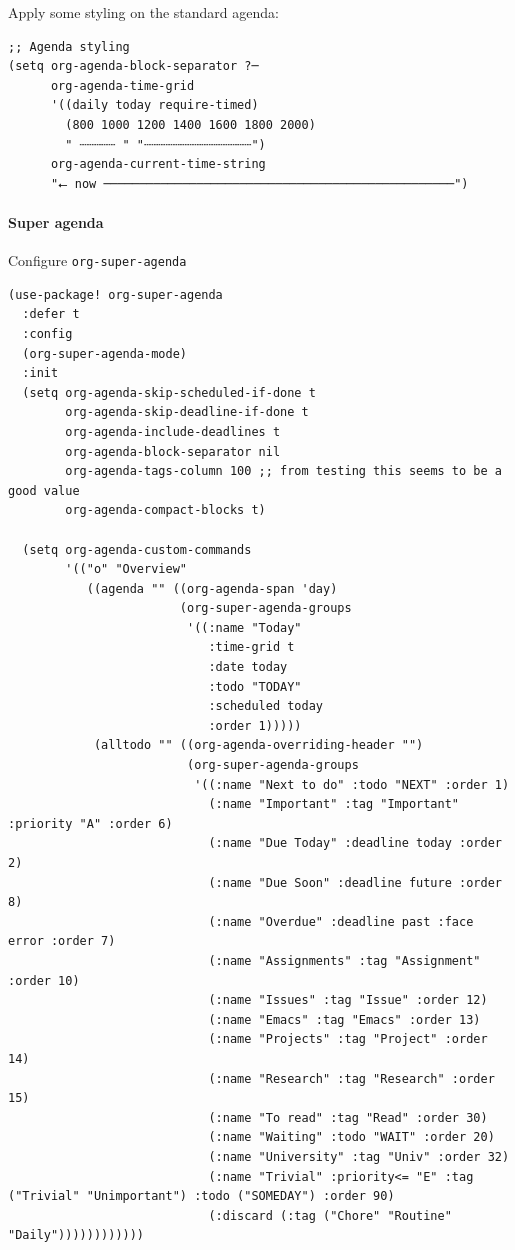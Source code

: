 \documentclass[11pt]{article}
\begin{document}
Apply some styling on the standard agenda:

\begin{verbatim}
;; Agenda styling
(setq org-agenda-block-separator ?─
      org-agenda-time-grid
      '((daily today require-timed)
        (800 1000 1200 1400 1600 1800 2000)
        " ┄┄┄┄┄ " "┄┄┄┄┄┄┄┄┄┄┄┄┄┄┄")
      org-agenda-current-time-string
      "⭠ now ─────────────────────────────────────────────────")
\end{verbatim}

\paragraph{Super agenda}
\label{sec:org330f9b6}
Configure \texttt{org-super-agenda}

\begin{verbatim}
(use-package! org-super-agenda
  :defer t
  :config
  (org-super-agenda-mode)
  :init
  (setq org-agenda-skip-scheduled-if-done t
        org-agenda-skip-deadline-if-done t
        org-agenda-include-deadlines t
        org-agenda-block-separator nil
        org-agenda-tags-column 100 ;; from testing this seems to be a good value
        org-agenda-compact-blocks t)

  (setq org-agenda-custom-commands
        '(("o" "Overview"
           ((agenda "" ((org-agenda-span 'day)
                        (org-super-agenda-groups
                         '((:name "Today"
                            :time-grid t
                            :date today
                            :todo "TODAY"
                            :scheduled today
                            :order 1)))))
            (alltodo "" ((org-agenda-overriding-header "")
                         (org-super-agenda-groups
                          '((:name "Next to do" :todo "NEXT" :order 1)
                            (:name "Important" :tag "Important" :priority "A" :order 6)
                            (:name "Due Today" :deadline today :order 2)
                            (:name "Due Soon" :deadline future :order 8)
                            (:name "Overdue" :deadline past :face error :order 7)
                            (:name "Assignments" :tag "Assignment" :order 10)
                            (:name "Issues" :tag "Issue" :order 12)
                            (:name "Emacs" :tag "Emacs" :order 13)
                            (:name "Projects" :tag "Project" :order 14)
                            (:name "Research" :tag "Research" :order 15)
                            (:name "To read" :tag "Read" :order 30)
                            (:name "Waiting" :todo "WAIT" :order 20)
                            (:name "University" :tag "Univ" :order 32)
                            (:name "Trivial" :priority<= "E" :tag ("Trivial" "Unimportant") :todo ("SOMEDAY") :order 90)
                            (:discard (:tag ("Chore" "Routine" "Daily"))))))))))))
\end{verbatim}
\end{document}
